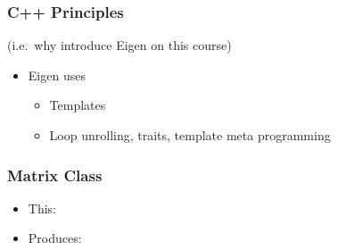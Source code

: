 \subsubsection{C++ Principles}\label{c-principles}

(i.e.~why introduce Eigen on this course)

\begin{itemize}
\itemsep1pt\parskip0pt
\item
  Eigen uses

  \begin{itemize}
  \itemsep1pt\parskip0pt
  \item
    Templates
  \item
    Loop unrolling, traits, template meta programming
  \end{itemize}
\end{itemize}

\subsubsection{Matrix Class}\label{matrix-class}

\begin{itemize}
\itemsep1pt\parskip0pt
\item
  This:
\end{itemize}

\begin{Shaded}
\begin{Highlighting}[]
 
 
\NormalTok{\{}
  \NormalTok{,}\NormalTok{);}
  \NormalTok{,}\NormalTok{) = }\NormalTok{;}
  \NormalTok{,}\NormalTok{) = }\NormalTok{;}
  \NormalTok{,}\NormalTok{) = -}\NormalTok{;}
  \NormalTok{,}\NormalTok{,}\NormalTok{,}\NormalTok{);}
\NormalTok{\}}
\end{Highlighting}
\end{Shaded}

\begin{itemize}
\itemsep1pt\parskip0pt
\item
  Produces:
\end{itemize}

